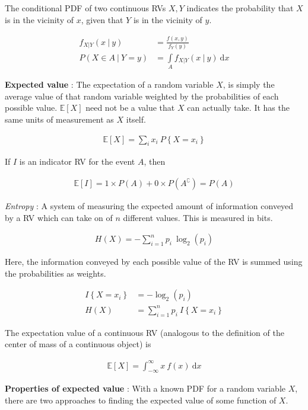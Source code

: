 The conditional PDF of two continuous RVs $ X, Y $ indicates the probability that $ X $ is in the vicinity of $ x $, given that $ Y $ is in the vicinity of $ y $.

\begin{align}
	f_{X|Y}(x\ |\ y) &= \frac{f(x, y)}{f_Y(y)} \\
	P(X \in A\ |\ Y = y) &= \int\limits_{A} f_{X|Y}(x\ |\ y) \ \mathrm{d} x
\end{align}

\textbf{Expected value} : The expectation of a random variable $ X $, is simply the average value of that random variable weighted by the probabilities of each possible value. $ \mathbb{E}[X] $ need not be a value that $ X $ can actually take. It has the same units of measurement as $ X $ itself.

\begin{align}
	\mathbb{E}[X] = \sum\limits_{i} x_i\ P \left\{ X = x_i \right\} 
\end{align}

If $ I $ is an indicator RV for the event $ A $, then 

\begin{align}
	\mathbb{E}[I] = 1 \times P(A) + 0 \times P(A^\complement) = P(A)
\end{align}

\textit{Entropy} : A system of measuring the expected amount of information conveyed by a RV which can take on of $ n $ different values. This is measured in bits.

\begin{align}
	H(X) = -\sum\limits_{i = 1}^{n} p_i \ \log_{2}(p_i)
\end{align}

Here, the information conveyed by each possible value of the RV is summed using the probabilities as weights.

\begin{align}
	I\left\{X = x_i\right\} &= -\log_{2}(p_i) \\
	H(X) &= \sum\limits_{i = 1}^{n} p_i \ I\left\{X = x_i\right\}
\end{align}

The expectation value of a continuous RV (analogous to the definition of the center of mass of a continuous object) is

\begin{align}
	\mathbb{E}[X] = \int_{-\infty}^{\infty} x\ f(x)\ \mathrm{d}x
\end{align}

\textbf{Properties of expected value} : With a known PDF for a random variable $ X $, there are two approaches to finding the expected value of some function of $ X $.

